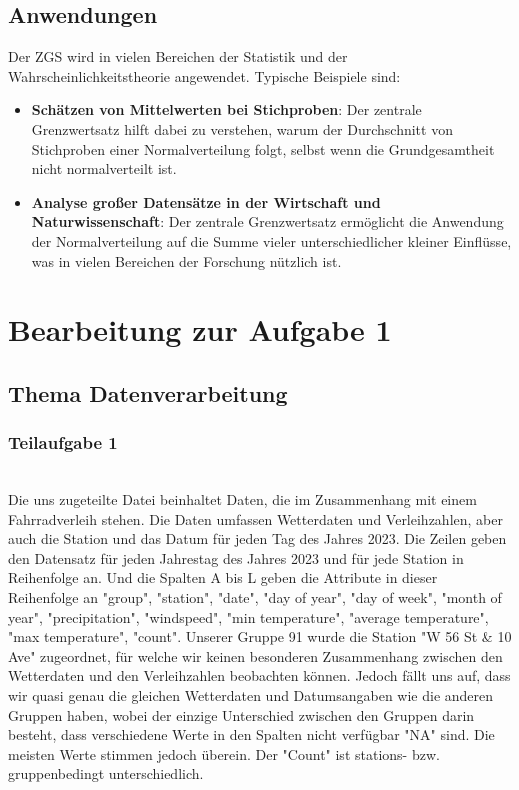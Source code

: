 \documentclass[a4paper,12pt]{article}
\begin{document}
\subsection{Anwendungen}
Der ZGS wird in vielen Bereichen der Statistik und der Wahrscheinlichkeitstheorie angewendet. Typische Beispiele sind:

\begin{itemize}
    \item \textbf{Schätzen von Mittelwerten bei Stichproben}: Der zentrale Grenzwertsatz hilft dabei zu verstehen, warum der Durchschnitt von Stichproben einer Normalverteilung folgt, selbst wenn die Grundgesamtheit nicht normalverteilt ist.
    \item \textbf{Analyse großer Datensätze in der Wirtschaft und Naturwissenschaft}: Der zentrale Grenzwertsatz ermöglicht die Anwendung der Normalverteilung auf die Summe vieler unterschiedlicher kleiner Einflüsse, was in vielen Bereichen der Forschung nützlich ist.
\end{itemize}

\newpage
\section{Bearbeitung zur Aufgabe 1}
\subsection{Thema Datenverarbeitung} 
\subsubsection {Teilaufgabe 1} \\ Die uns zugeteilte Datei beinhaltet Daten, die im Zusammenhang mit einem Fahrradverleih stehen. Die Daten umfassen Wetterdaten und Verleihzahlen, aber auch die Station und das Datum für jeden Tag des Jahres 2023. Die Zeilen geben den Datensatz für jeden Jahrestag des Jahres 2023 und für jede Station in Reihenfolge an. Und die Spalten A bis L geben die Attribute in dieser Reihenfolge an "group", "station", "date", "day of year", "day of week", "month of year", "precipitation", "windspeed", "min temperature", "average temperature", "max temperature", "count". Unserer Gruppe 91 wurde die Station "W 56 St & 10 Ave" zugeordnet, für welche wir keinen besonderen Zusammenhang zwischen den Wetterdaten und den Verleihzahlen beobachten können. Jedoch fällt uns auf, dass wir quasi genau die gleichen Wetterdaten und Datumsangaben wie die anderen Gruppen haben, wobei der einzige Unterschied zwischen den Gruppen darin besteht, dass verschiedene Werte in den Spalten nicht verfügbar "NA" sind. Die meisten Werte stimmen jedoch überein. Der "Count"  ist stations- bzw. gruppenbedingt unterschiedlich. 
\\
\end{document}
